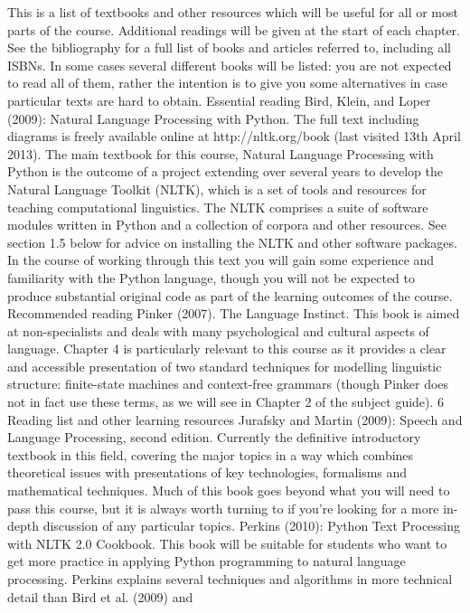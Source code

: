 This is a list of textbooks and other resources which will be useful for all or most
parts of the course. Additional readings will be given at the start of each chapter. See
the bibliography for a full list of books and articles referred to, including all ISBNs.
In some cases several different books will be listed: you are not expected to read all
of them, rather the intention is to give you some alternatives in case particular texts
are hard to obtain.
Essential reading
Bird, Klein, and Loper (2009): Natural Language Processing with Python. The full
text including diagrams is freely available online at http://nltk.org/book (last
visited 13th April 2013). The main textbook for this course, Natural Language
Processing with Python is the outcome of a project extending over several years
to develop the Natural Language Toolkit (NLTK), which is a set of tools and
resources for teaching computational linguistics. The NLTK comprises a suite of
software modules written in Python and a collection of corpora and other
resources. See section 1.5 below for advice on installing the NLTK and other
software packages.
In the course of working through this text you will gain some experience and
familiarity with the Python language, though you will not be expected to
produce substantial original code as part of the learning outcomes of the course.
Recommended reading
Pinker (2007). The Language Instinct. This book is aimed at non-specialists and
deals with many psychological and cultural aspects of language. Chapter 4 is
particularly relevant to this course as it provides a clear and accessible
presentation of two standard techniques for modelling linguistic structure:
finite-state machines and context-free grammars (though Pinker does not in fact
use these terms, as we will see in Chapter 2 of the subject guide).
6
Reading list and other learning resources
Jurafsky and Martin (2009): Speech and Language Processing, second edition.
Currently the definitive introductory textbook in this field, covering the major
topics in a way which combines theoretical issues with presentations of key
technologies, formalisms and mathematical techniques. Much of this book goes
beyond what you will need to pass this course, but it is always worth turning to
if you’re looking for a more in-depth discussion of any particular topics.
Perkins (2010): Python Text Processing with NLTK 2.0 Cookbook. This book will be
suitable for students who want to get more practice in applying Python
programming to natural language processing. Perkins explains several
techniques and algorithms in more technical detail than Bird et al. (2009) and
